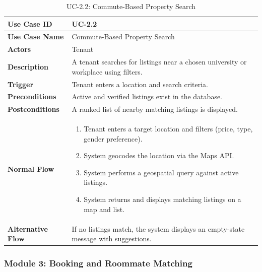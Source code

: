 \begin{table}[h]
\centering
\caption{UC-2.2: Commute-Based Property Search}

\begin{tabularx}{\textwidth}{
|>{\raggedright\arraybackslash}p{3.5cm}
|>{\raggedright\arraybackslash}X|}

\hline
\textbf{Use Case ID} & UC-2.2 \\ \hline
\textbf{Use Case Name} & Commute-Based Property Search \\ \hline
\textbf{Actors} & Tenant \\ \hline
\textbf{Description} & A tenant searches for listings near a chosen university or workplace using filters. \\ \hline
\textbf{Trigger} & Tenant enters a location and search criteria. \\ \hline
\textbf{Preconditions} & Active and verified listings exist in the database. \\ \hline
\textbf{Postconditions} & A ranked list of nearby matching listings is displayed. \\ \hline
\textbf{Normal Flow} &
\begin{enumerate}
    \item Tenant enters a target location and filters (price, type, gender preference).
    \item System geocodes the location via the Maps API.
    \item System performs a geospatial query against active listings.
    \item System returns and displays matching listings on a map and list.
\end{enumerate}
\\ \hline
\textbf{Alternative Flow} &
If no listings match, the system displays an empty-state message with suggestions.
\\ \hline

\end{tabularx}

\end{table}

\subsubsection{Module 3: Booking and Roommate Matching}

